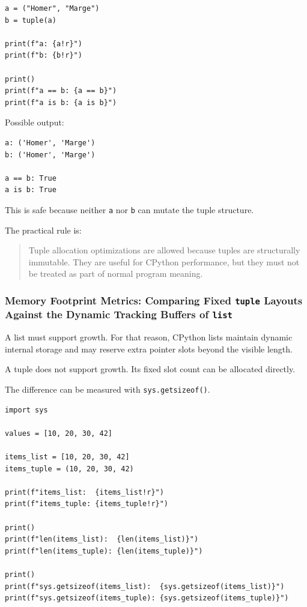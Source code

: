 \begin{verbatim}
a = ("Homer", "Marge")
b = tuple(a)

print(f"a: {a!r}")
print(f"b: {b!r}")

print()
print(f"a == b: {a == b}")
print(f"a is b: {a is b}")
\end{verbatim}

Possible output:

\begin{verbatim}
a: ('Homer', 'Marge')
b: ('Homer', 'Marge')

a == b: True
a is b: True
\end{verbatim}

This is safe because neither \texttt{a} nor \texttt{b} can mutate the tuple structure.

The practical rule is:

\begin{quote}
Tuple allocation optimizations are allowed because tuples are structurally immutable. They are useful for CPython performance, but they must not be treated as part of normal program meaning.
\end{quote}

\subsubsection{Memory Footprint Metrics: Comparing Fixed \texttt{tuple} Layouts Against the Dynamic Tracking Buffers of \texttt{list}}

A list must support growth. For that reason, CPython lists maintain dynamic internal storage and may reserve extra pointer slots beyond the visible length.

A tuple does not support growth. Its fixed slot count can be allocated directly.

The difference can be measured with \texttt{sys.getsizeof()}.

\begin{verbatim}
import sys

values = [10, 20, 30, 42]

items_list = [10, 20, 30, 42]
items_tuple = (10, 20, 30, 42)

print(f"items_list:  {items_list!r}")
print(f"items_tuple: {items_tuple!r}")

print()
print(f"len(items_list):  {len(items_list)}")
print(f"len(items_tuple): {len(items_tuple)}")

print()
print(f"sys.getsizeof(items_list):  {sys.getsizeof(items_list)}")
print(f"sys.getsizeof(items_tuple): {sys.getsizeof(items_tuple)}")
\end{verbatim}


